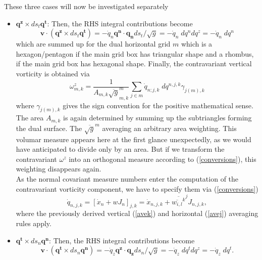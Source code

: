 These three cases will now be investigated separately
\begin{itemize}
 \item $\mathbf{q^z}\times ds_t\mathbf{q^t}$: Then, the RHS integral contributions become
       \begin{displaymath}
        \mathbf{v}\cdot(\mathbf{q^z}\times ds_t\mathbf{q^t})=-\dot{q}_n\mathbf{q^n}\cdot\mathbf{q_n} ds_t/\sqrt{g}
        =-\dot{q}_n\; dq^ndq^z=-\dot{q}_n\; dq^n
       \end{displaymath}
       which are summed up for the dual horizontal grid $m$ which is a hexagon/pentagon if the main
       grid box has triangular shape and a rhombus, if the main grid box has hexagonal shape. Finally, the
       contravariant vertical vorticity is obtained via
       \begin{displaymath}
        \omega^{z}_{m,k}=\frac{1}{A_{m,k}\overline{\sqrt{g}}^m_{m,k}}
        \sum_{j \in m}\dot{q}_{n;j,k}\; dq^{n,j,k}\gamma_{j(m),k}
       \end{displaymath}
       where $\gamma_{j(m),k}$ gives the sign convention for the positive mathematical sense.
       The area $A_{m,k}$
       is again determined by summing up the subtriangles forming the dual surface.
       The $\overline{\sqrt{g}}^m$
       averaging an arbitrary area weighting. This volumar measure appears here at the
       first glance unexpectedly, as we would have anticipated to divide only by an area.
       But if we transform the contravariant $\omega^{z}$ into an orthogonal measure according to
       (\ref{conversions}), this weighting disappears again.\\
       As the normal covariant measure numbers enter the computation of the contravariant vorticity
       component, we have to specify them via (\ref{conversions})
       \begin{displaymath}
        \dot{q}_{n,j,k}=[\dot{x}_n+wJ_n]_{j,k}=\dot{x}_{n,j,k}+
                        \overline{\overline{w_{i,l}}^k}^jJ_{n,j,k},
       \end{displaymath}
       where the previously derived vertical (\ref{avek}) and horizontal (\ref{avej}) averaging rules apply.
 \item $\mathbf{q^t}\times ds_n\mathbf{q^n}$: Then, the RHS integral contributions become
       \begin{displaymath}
        \mathbf{v}\cdot(\mathbf{q^t}\times ds_n\mathbf{q^n})=-\dot{q}_z\mathbf{q^z}\cdot \mathbf{q_z}ds_n/\sqrt{g}
        =-\dot{q}_z\; dq^tdq^z=-\dot{q}_z\; dq^t.
       \end{displaymath}

\end{itemize}
